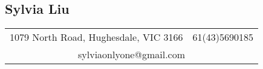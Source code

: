 \documentclass[a4paper,11pt]{article}
\begin{document}
\begin{comment}
Dear Sir/Madame,

I am a software engineer with 6 years C/C++ experience including 1.5 years web development experience. I think my rich skills will most match your requirements and add value to you with following skills:
- C++ expert
- Rich knowledge on Linux platform
- SOAP network programming experience
- Enthusiasm in open source software
- Agile team player
- test-driven development and robots lover
- Self-motivated and quick learner
- Rich working experience make me easy warm up in team work

Besides that, you can find more details in my attached resume.
Your description of the position really attracted me, and I am willing to work for such an exciting organization. Hope my abilities may contribute to you.

Thank you for considering my application.
Waiting to hear from you soon.

Yours sincerely,
Sylvia
\end{comment}

\begin{center}
  \section*{Sylvia Liu}
  \begin{tabular}{l r}
    1079 North Road, Hughesdale, VIC 3166 & 61(43)5690185 \\
    \multicolumn{2}{c}{sylviaonlyone@gmail.com} \\
  \end{tabular}
\end{center}

\end{document}
